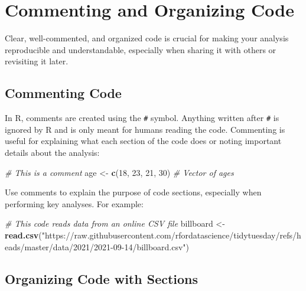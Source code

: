 \documentclass[
]{book}
\newenvironment{Shaded}{\begin{snugshade}}{\end{snugshade}}
\newcommand{\CommentTok}[1]{\textcolor[rgb]{0.56,0.35,0.01}{\textit{#1}}}
\newcommand{\DecValTok}[1]{\textcolor[rgb]{0.00,0.00,0.81}{#1}}
\newcommand{\FunctionTok}[1]{\textcolor[rgb]{0.13,0.29,0.53}{\textbf{#1}}}
\newcommand{\NormalTok}[1]{#1}
\newcommand{\OtherTok}[1]{\textcolor[rgb]{0.56,0.35,0.01}{#1}}
\newcommand{\StringTok}[1]{\textcolor[rgb]{0.31,0.60,0.02}{#1}}
\begin{document}
\section{Commenting and Organizing Code}\label{commenting-and-organizing-code}

Clear, well-commented, and organized code is crucial for making your analysis reproducible and understandable, especially when sharing it with others or revisiting it later.

\subsection*{Commenting Code}\label{commenting-code}

In R, comments are created using the \texttt{\#} symbol. Anything written after \texttt{\#} is ignored by R and is only meant for humans reading the code. Commenting is useful for explaining what each section of the code does or noting important details about the analysis:

\begin{Shaded}
\begin{Highlighting}[]
\CommentTok{\# This is a comment}
\NormalTok{age }\OtherTok{\textless{}{-}} \FunctionTok{c}\NormalTok{(}\DecValTok{18}\NormalTok{, }\DecValTok{23}\NormalTok{, }\DecValTok{21}\NormalTok{, }\DecValTok{30}\NormalTok{)  }\CommentTok{\# Vector of ages}
\end{Highlighting}
\end{Shaded}

Use comments to explain the purpose of code sections, especially when performing key analyses. For example:

\begin{Shaded}
\begin{Highlighting}[]
\CommentTok{\# This code reads data from an online CSV file}
\NormalTok{billboard }\OtherTok{\textless{}{-}} \FunctionTok{read.csv}\NormalTok{(}\StringTok{"https://raw.githubusercontent.com/rfordatascience/tidytuesday/refs/heads/master/data/2021/2021{-}09{-}14/billboard.csv"}\NormalTok{)}
\end{Highlighting}
\end{Shaded}

\subsection*{Organizing Code with Sections}\label{organizing-code-with-sections}
\end{document}
